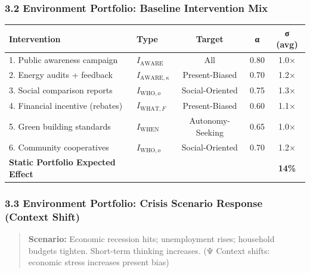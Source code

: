 \subsubsection*{3.2 Environment Portfolio: Baseline Intervention Mix}

\begin{center}
\begin{tabular}{@{}llccc@{}}
\toprule
\textbf{Intervention} & \textbf{Type} & \textbf{Target} & \textbf{α} & \textbf{σ (avg)} \\
\midrule
1. Public awareness campaign & $I_{\text{AWARE}}$ & All & 0.80 & 1.0× \\
2. Energy audits + feedback & $I_{\text{AWARE},\kappa}$ & Present-Biased & 0.70 & 1.2× \\
3. Social comparison reports & $I_{\text{WHO},o}$ & Social-Oriented & 0.75 & 1.3× \\
4. Financial incentive (rebates) & $I_{\text{WHAT},F}$ & Present-Biased & 0.60 & 1.1× \\
5. Green building standards & $I_{\text{WHEN}}$ & Autonomy-Seeking & 0.65 & 1.0× \\
6. Community cooperatives & $I_{\text{WHO},o}$ & Social-Oriented & 0.70 & 1.2× \\
\midrule
\textbf{Static Portfolio Expected Effect} & & & & \textbf{14\%} \\
\midrule
\end{tabular}
\end{center}

\subsubsection*{3.3 Environment Portfolio: Crisis Scenario Response (Context Shift)}

\begin{quote}
\textbf{Scenario:} Economic recession hits; unemployment rises; household budgets tighten. Short-term thinking increases. (Ψ Context shifts: economic stress increases present bias)
\end{quote}

